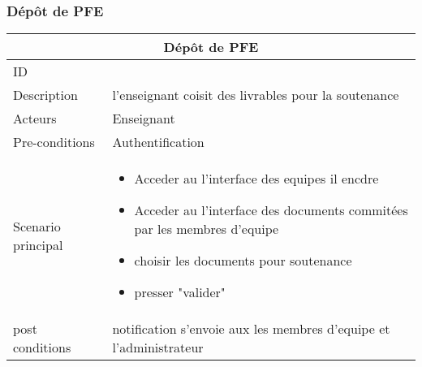 \documentclass[11pt,fleqn]{book} %
\begin{document}
\subsubsection{Dépôt  de PFE}
\begin{center}
\begin{tabularx}{1\textwidth} { | p{4cm} | >{\raggedright\arraybackslash}X |  }
  \hline
  \multicolumn{2}{|c|}{Dépôt de PFE} \\
 \hline
 ID & 1  \\
 \hline
 Description  & l'enseignant coisit des livrables pour la soutenance   \\
  \hline
 Acteurs  & Enseignant   \\
  \hline
 Pre-conditions  & Authentification\\
 \hline
 Scenario principal  &  
 \begin{itemize}
     \item  Acceder au l'interface des equipes il encdre 
     \item  Acceder au l'interface des documents commitées par les membres d'equipe
     \item choisir les documents pour soutenance
     \item presser "valider" 
     
 \end{itemize}\\
  \hline
 post conditions  & notification s'envoie aux les membres d'equipe et l'administrateur \\
  \hline
\end{tabularx}
\label{tbl:nicetablelesstable}
\end{center}
\end{document}
